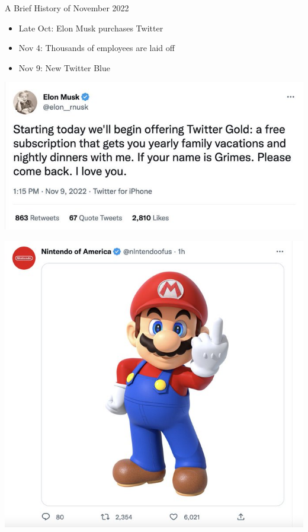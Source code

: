 \documentclass{beamer}
\begin{document}
\begin{frame}{A Brief History of November 2022}
	\begin{itemize}
		\pause
		\item Late Oct: Elon Musk purchases Twitter
		\pause
		\item Nov 4: Thousands of employees are laid off
		\pause
		\item Nov 9: New Twitter Blue
	\end{itemize}
\end{frame}
\begin{frame}
	\includegraphics[width = \textwidth]{twitter-gold}
\end{frame}

\begin{frame}
	\includegraphics[height = \textheight]{itsame}
\end{frame}
\end{document}
